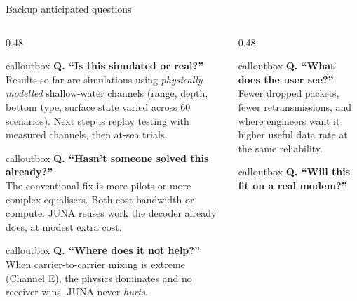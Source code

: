 \documentclass[aspectratio=169,10pt]{beamer}
\begin{document}
\begin{frame}{Backup \textendash{} anticipated questions}
  \footnotesize
  \begin{columns}[T,onlytextwidth]
    \begin{column}{0.48\textwidth}
      \begin{beamercolorbox}[wd=\linewidth,sep=6pt,rounded=true]{calloutbox}
        \textbf{Q. ``Is this simulated or real?''}\\
        Results so far are simulations using \emph{physically modelled} shallow-water channels (range, depth, bottom type, surface state varied across 60 scenarios). Next step is replay testing with measured channels, then at-sea trials.
      \end{beamercolorbox}
      \vspace{0.3em}
      \begin{beamercolorbox}[wd=\linewidth,sep=6pt,rounded=true]{calloutbox}
        \textbf{Q. ``Hasn't someone solved this already?''}\\
        The conventional fix is more pilots or more complex equalisers. Both cost bandwidth or compute. JUNA reuses work the decoder already does, at modest extra cost.
      \end{beamercolorbox}
      \vspace{0.3em}
      \begin{beamercolorbox}[wd=\linewidth,sep=6pt,rounded=true]{calloutbox}
        \textbf{Q. ``Where does it not help?''}\\
        When carrier-to-carrier mixing is extreme (Channel E), the physics dominates and no receiver wins. JUNA never \emph{hurts}.
      \end{beamercolorbox}
    \end{column}
    \begin{column}{0.48\textwidth}
      \begin{beamercolorbox}[wd=\linewidth,sep=6pt,rounded=true]{calloutbox}
        \textbf{Q. ``What does the user see?''}\\
        Fewer dropped packets, fewer retransmissions, and \textendash{} where engineers want it \textendash{} higher useful data rate at the same reliability.
      \end{beamercolorbox}
      \vspace{0.3em}
      \begin{beamercolorbox}[wd=\linewidth,sep=6pt,rounded=true]{calloutbox}
        \textbf{Q. ``Will this fit on a real modem?''}\\

\end{beamercolorbox}
\end{column}
\end{columns}
\end{frame}
\end{document}
